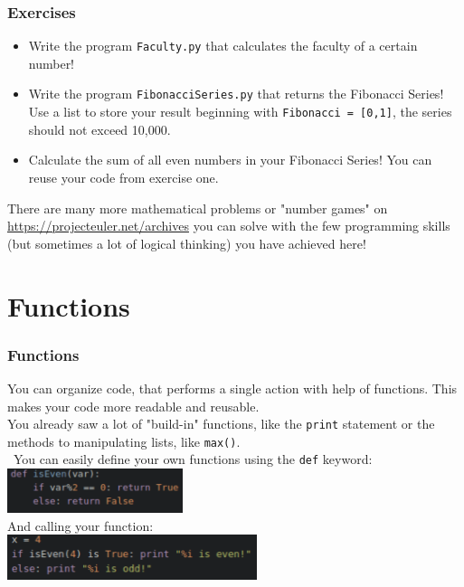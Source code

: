 \documentclass{beamer}
\begin{document}
\begin{frame}
\frametitle{Exercises}
	\begin{itemize}
		\item Write the program \texttt{Faculty.py} that calculates the faculty of a certain number!
		\item Write the program \texttt{FibonacciSeries.py} that returns the Fibonacci Series! Use a list to store your result beginning with \texttt{Fibonacci = [0,1]}, the series should not exceed 10,000.
		\item Calculate the sum of all even numbers in your Fibonacci Series! You can reuse your code from exercise one.
	\end{itemize}
	There are many more mathematical problems or "number games" on \url {https://projecteuler.net/archives} you can solve with the few programming skills (but sometimes a lot of logical thinking) you have achieved here!
\end{frame}

\section{Functions}

\begin{frame}
\frametitle{Functions}
	You can organize code, that performs a single action with help of functions. This makes your code more readable and reusable. \\ You already saw a lot of "build-in" functions, like the \texttt{print} statement or the methods to manipulating lists, like \texttt{max()}. \\\ You can easily define your own functions using the \texttt{def} keyword:\\
		\includegraphics[height = 1.3cm]{isEvenFunc.pdf}\\
	And calling your function: \\
		\includegraphics[height = 1.3cm]{FunctionUse.pdf}	 
\end{frame}
\end{document}
